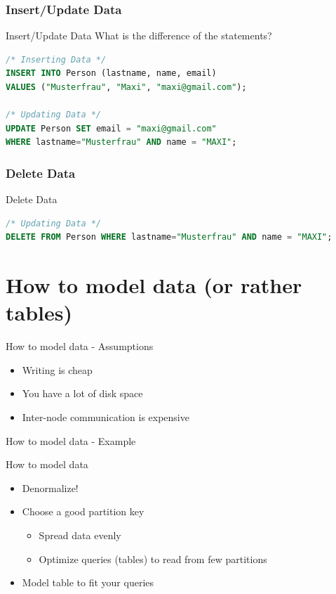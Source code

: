 \documentclass[
  10pt
]{beamer}
\begin{document}
\subsubsection{Insert/Update Data}
\begin{frame}[fragile]{Insert/Update Data}
  What is the difference of the statements?
  \begin{lstlisting}[language=SQL]
/* Inserting Data */
INSERT INTO Person (lastname, name, email)
VALUES ("Musterfrau", "Maxi", "maxi@gmail.com");

/* Updating Data */
UPDATE Person SET email = "maxi@gmail.com"
WHERE lastname="Musterfrau" AND name = "MAXI";
  \end{lstlisting}
\end{frame}

\subsubsection{Delete Data}
\begin{frame}[fragile]{Delete Data}
  \begin{lstlisting}[language=SQL]
/* Updating Data */
DELETE FROM Person WHERE lastname="Musterfrau" AND name = "MAXI";
  \end{lstlisting}
\end{frame}

\section{How to model data (or rather tables)}  %

\begin{frame}{How to model data - Assumptions}
  \begin{itemize}
    \item Writing is cheap
    \item You have a lot of disk space
    \item Inter-node communication is expensive
  \end{itemize}
\end{frame}

\begin{frame}{How to model data - Example}
\end{frame}

\begin{frame}{How to model data}
  \begin{itemize}
    \item Denormalize!
    \item Choose a good partition key
      \begin{itemize}
        \item Spread data evenly
        \item Optimize queries (tables) to read from few partitions
      \end{itemize}
    \item Model table to fit your queries
  \end{itemize}
\end{frame}
\end{document}
